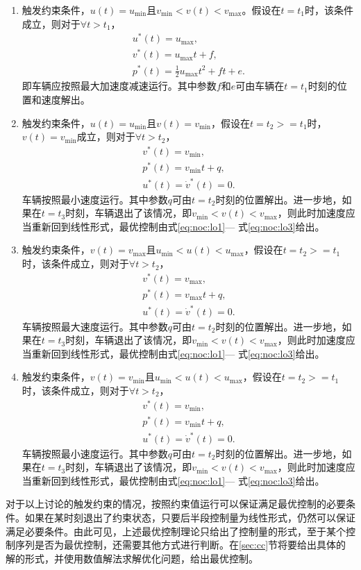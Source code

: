 \begin{enumerate}[label=(\arabic*),wide=\parindent]
\item 触发约束条件，$u(t)=u_{\min}$且$v_{\min}<v(t)<v_{\max}$。假设在$t=t_1$时，该条件成立，则对于$\forall t>t_1$，
\begin{gather}
u^*(t)=u_{\max},\\
v^*(t)=u_{\max}t+f,\\
p^*(t)=\frac12u_{\max}t^2+ft+e.
\end{gather}
即车辆应按照最大加速度减速运行。其中参数$f$和$e$可由车辆在$t=t_1$时刻的位置和速度解出。
\item 触发约束条件，$u(t)=u_{\min}$且$v(t)=v_{\min}$，假设在$t=t_2>=t_1$时，$v(t)=v_{\min}$成立，则对于$\forall t>t_2$，
\begin{gather}
v^*(t)=v_{\min},\\
p^*(t)=v_{\min}t+q,\\
u^*(t)=\dot{v}^*(t)=0.
\end{gather}
车辆按照最小速度运行。其中参数$q$可由$t=t_2$时刻的位置解出。进一步地，如果在$t=t_3$时刻，车辆退出了该情况，即$v_{\min}<v(t)<v_{\max}$，则此时加速度应当重新回到线性形式，最优控制由式\eqref{eq:noc:lo1}--- 式\eqref{eq:noc:lo3}给出。
\item 触发约束条件，$v(t)=v_{\max}$且$u_{\min}<u(t)<u_{\max}$，假设在$t=t_2>=t_1$时，该条件成立，则对于$\forall t>t_2$，
\begin{gather}
v^*(t)=v_{\max},\\
p^*(t)=v_{\max}t+q,\\
u^*(t)=\dot{v}^*(t)=0.
\end{gather}
车辆按照最大速度运行。其中参数$q$可由$t=t_2$时刻的位置解出。进一步地，如果在$t=t_3$时刻，车辆退出了该情况，即$v_{\min}<v(t)<v_{\max}$，则此时加速度应当重新回到线性形式，最优控制由式\eqref{eq:noc:lo1}--- 式\eqref{eq:noc:lo3}给出。
\item 触发约束条件，$v(t)=v_{\min}$且$u_{\min}<u(t)<u_{\max}$，假设在$t=t_2>=t_1$时，该条件成立，则对于$\forall t>t_2$，
\begin{gather}
v^*(t)=v_{\min},\\
p^*(t)=v_{\min}t+q,\\
u^*(t)=\dot{v}^*(t)=0.
\end{gather}
车辆按照最小速度运行。其中参数$q$可由$t=t_2$时刻的位置解出。进一步地，如果在$t=t_3$时刻，车辆退出了该情况，即$v_{\min}<v(t)<v_{\max}$，则此时加速度应当重新回到线性形式，最优控制由式\eqref{eq:noc:lo1}--- 式\eqref{eq:noc:lo3}给出。
\end{enumerate}
\begin{remark}
对于以上讨论的触发约束的情况，按照约束值运行可以保证满足最优控制的必要条件。如果在某时刻退出了约束状态，只要后半段控制量为线性形式，仍然可以保证满足必要条件。由此可见，上述最优控制理论只给出了控制量的形式，至于某个控制序列是否为最优控制，还需要其他方式进行判断。在\ref{sec:cc}节将要给出具体的解的形式，并使用数值解法求解优化问题，给出最优控制。
\end{remark}